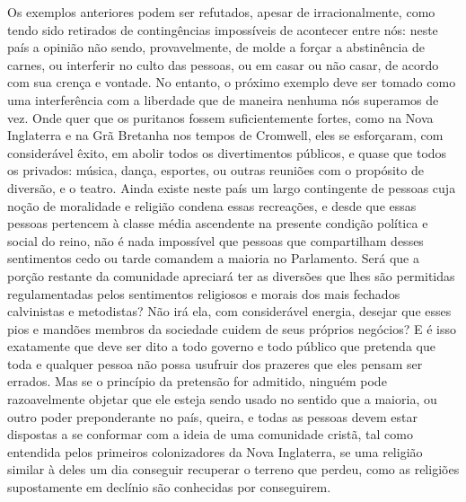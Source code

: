 Os exemplos anteriores podem ser refutados, apesar de irracionalmente,
como tendo sido retirados de contingências impossíveis de acontecer
entre nós: neste país a opinião não sendo, provavelmente, de molde a
forçar a abstinência de carnes, ou interferir no culto das pessoas, ou
em casar ou não casar, de acordo com sua crença e vontade. No entanto,
o próximo exemplo deve ser tomado como uma interferência com a
liberdade que de maneira nenhuma nós superamos de vez. Onde quer que os
puritanos fossem suficientemente fortes, como na Nova Inglaterra e na
Grã Bretanha nos tempos de Cromwell, eles se esforçaram, com
considerável êxito, em abolir todos os divertimentos públicos, e quase
que todos os privados: música, dança, esportes, ou outras reuniões com
o propósito de diversão, e o teatro. Ainda existe neste país um largo
contingente de pessoas cuja noção de moralidade e religião condena
essas recreações, e desde que essas pessoas pertencem à classe média
ascendente na presente condição política e social do reino, não é nada
impossível que pessoas que compartilham desses sentimentos cedo ou
tarde comandem a maioria no Parlamento. Será que a porção restante da
comunidade apreciará ter as diversões que lhes são permitidas
regulamentadas pelos sentimentos religiosos e morais dos mais fechados
calvinistas e metodistas? Não irá ela, com considerável energia,
desejar que esses pios e mandões membros da sociedade cuidem de seus
próprios negócios? E é isso exatamente que deve ser dito a todo governo
e todo público que pretenda que toda e qualquer pessoa não possa
usufruir dos prazeres que eles pensam ser errados. Mas se o princípio
da pretensão for admitido, ninguém pode razoavelmente objetar que ele
esteja sendo usado no sentido que a maioria, ou outro poder
preponderante no país, queira, e todas as pessoas devem estar dispostas
a se conformar com a ideia de uma comunidade cristã, tal como entendida
pelos primeiros colonizadores da Nova Inglaterra, se uma religião
similar à deles um dia conseguir recuperar o terreno que perdeu, como as
religiões supostamente em declínio são conhecidas por conseguirem.


